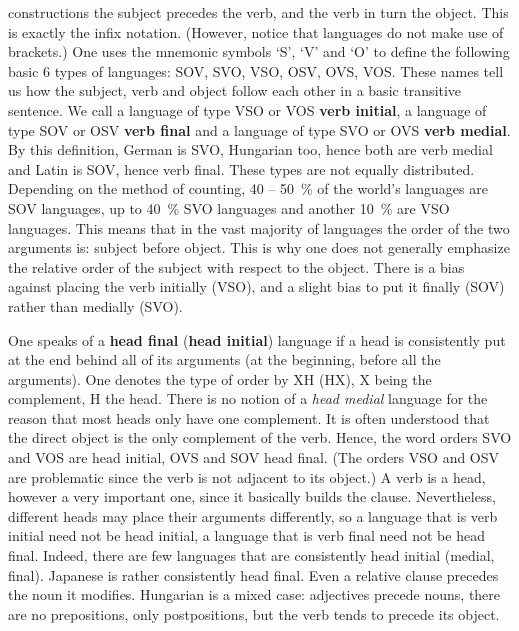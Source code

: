 constructions the subject precedes the verb, and the verb in turn
the object. This is exactly the infix notation. (However, notice
that languages do not make use of brackets.) One uses the mnemonic
symbols `S', `V' and `O' to define the following basic 6 types of
languages: SOV, SVO, VSO, OSV, OVS, VOS. These names tell us how
the subject, verb and object follow each other in a basic
transitive sentence. We call a language of type VSO or VOS 
%
%
%
\textbf{verb initial}, a language of type SOV or OSV \textbf{verb
final} and a language of type SVO or OVS \textbf{verb medial}. By
this definition, German 
is SVO, Hungarian too, hence both are verb
medial and Latin is SOV, hence verb final. These types are not
equally distributed. Depending on the method of counting, 
40 -- 50~\% of the world's
languages are SOV languages, up to 40~\% SVO languages and another
10~\% are VSO languages. This means that in the vast majority of
languages the order of the two arguments is: subject before
object. This is why one does not generally emphasize the relative
order of the subject with respect to the object. There is a bias
against placing the verb initially (VSO), and a slight bias to put
it finally (SOV) rather than medially (SVO).

One speaks of a \textbf{head final} 
(\textbf{head initial}) language if
a head is consistently put at the end behind all of its arguments
(at the beginning, before all the arguments). One denotes the type
of order by XH (HX), X being the complement, H the head.
There is no notion of a {\it head medial\/} language for the reason
that most heads only have one complement. It is often understood 
that the direct object is the only complement of the verb.
Hence, the word orders SVO and VOS are head initial, OVS and SOV head
final. (The orders VSO and OSV are problematic since the verb is
not adjacent to its object.) A verb is a head, however a very
important one, since it basically builds the clause. Nevertheless,
different heads may place their arguments differently, so a
language that is verb initial need not be head initial, a language
that is verb final need not be head final. Indeed, there are few
languages that are consistently head initial (medial, final).
Japanese is rather consistently head final. Even a
relative clause precedes the noun it modifies. Hungarian 
is a mixed case: adjectives precede nouns, there are no prepositions,
only postpositions, but the verb tends to precede its object.

